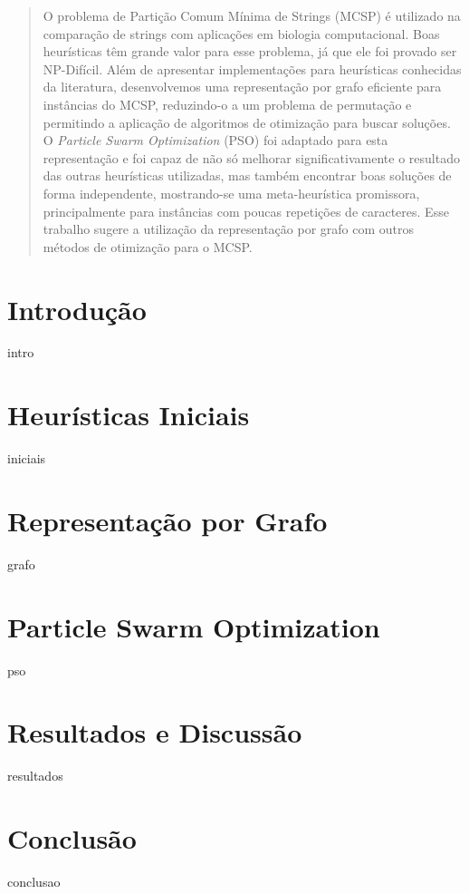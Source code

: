 \documentclass[11pt,twoside]{article}
\begin{document}

    \begin{abstract}
        O problema de Partição Comum Mínima de Strings (MCSP) é utilizado na comparação de strings com aplicações em biologia computacional. Boas heurísticas têm grande valor para esse problema, já que ele foi provado ser NP-Difícil. Além de apresentar implementações para heurísticas conhecidas da literatura, desenvolvemos uma representação por grafo eficiente para instâncias do MCSP, reduzindo-o a um problema de permutação e permitindo a aplicação de algoritmos de otimização para buscar soluções. O \textit{Particle Swarm Optimization} (PSO) foi adaptado para esta representação e foi capaz de não só melhorar significativamente o resultado das outras heurísticas utilizadas, mas também encontrar boas soluções de forma independente, mostrando-se uma meta-heurística promissora, principalmente para instâncias com poucas repetições de caracteres. Esse trabalho sugere a utilização da representação por grafo com outros métodos de otimização para o MCSP.
    \end{abstract}

    \raggedbottom

    \section{Introdução}
        {intro}

    \section{Heurísticas Iniciais}
        {iniciais}

    \section{Representação por Grafo}
        {grafo}

    \section{Particle Swarm Optimization}
        {pso}

    \section{Resultados e Discussão}
        {resultados}

    \section{Conclusão}
        {conclusao}

    \printbibliography[filter=footies]
\end{document}
